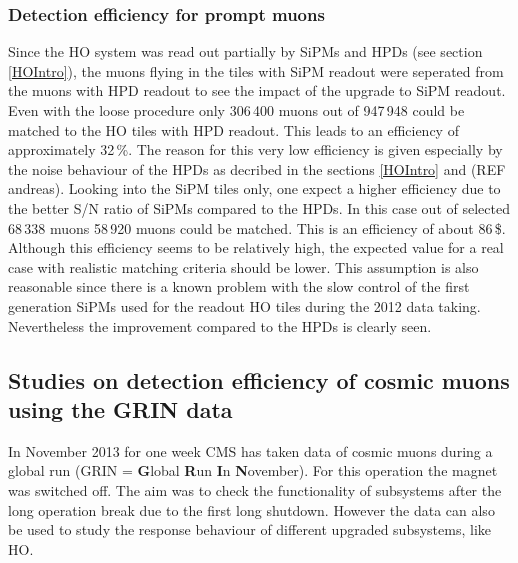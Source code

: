 		\subsubsection{Detection efficiency for prompt muons}
			Since the HO system was read out partially by SiPMs and HPDs (see section \ref{HOIntro}), the muons flying in the tiles with SiPM readout were seperated from the muons with HPD readout to see
			the impact of the upgrade to SiPM readout.
			Even with the loose procedure only 306\,400 muons out of 947\,948 could be matched to the HO tiles with HPD readout.
			This leads to an efficiency of approximately 32\,\%.
			The reason for this very low efficiency is given especially by the noise behaviour of the HPDs as decribed in the sections \ref{HOIntro} and (REF andreas).
			Looking into the SiPM tiles only, one expect a higher efficiency due to the better S/N ratio of SiPMs compared to the HPDs.
			In this case out of selected 68\,338 muons 58\,920 muons could be matched.
			This is an efficiency of about 86\,\$.
			Although this efficiency seems to be relatively high, the expected value for a real case with realistic matching criteria should be lower.
			This assumption is also reasonable since there is a known problem with the slow control of the first generation SiPMs used for the readout HO tiles during the 2012 data taking.
			Nevertheless the improvement compared to the HPDs is clearly seen.
	\subsection{Studies on detection efficiency of cosmic muons using the GRIN data} 
		In November 2013 for one week CMS has taken data of cosmic muons during a global run (GRIN = \textbf{G}lobal \textbf{R}un \textbf{I}n \textbf{N}ovember).
		For this operation the magnet was switched off.
		The aim was to check the functionality of subsystems after the long operation break due to the first long shutdown.
		However the data can also be used to study the response behaviour of different upgraded subsystems, like HO.
